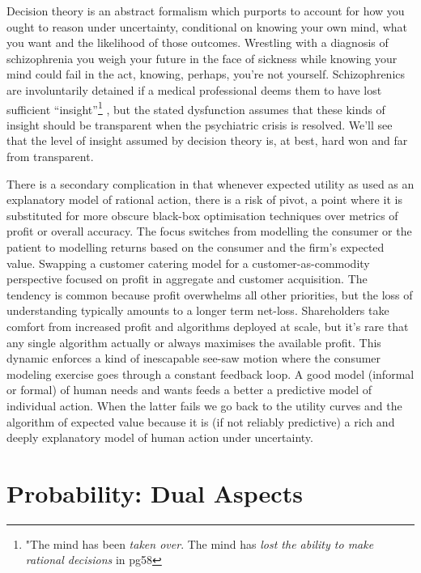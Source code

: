 \documentclass[
]{book}
\theoremstyle{definition}
\theoremstyle{definition}
\theoremstyle{definition}
\theoremstyle{remark}
\begin{document}
Decision theory is an abstract formalism which purports to account for how you ought to reason under uncertainty, conditional on knowing your own mind, what you want and the likelihood of those outcomes. Wrestling with a diagnosis of schizophrenia you weigh your future in the face of sickness while knowing your mind could fail in the act, knowing, perhaps, you're not yourself. Schizophrenics are involuntarily detained if a medical professional deems them to have lost sufficient ``insight''\footnote{"The mind has been \emph{taken over}. The mind has \emph{lost the ability to make rational decisions} in \citep{WangSchizophrenia} pg58} , but the stated dysfunction assumes that these kinds of insight should be transparent when the psychiatric crisis is resolved. We'll see that the level of insight assumed by decision theory is, at best, hard won and far from transparent.

There is a secondary complication in that whenever expected utility as used as an explanatory model of rational action, there is a risk of pivot, a point where it is substituted for more obscure black-box optimisation techniques over metrics of profit or overall accuracy. The focus switches from modelling the consumer or the patient to modelling returns based on the consumer and the firm's expected value. Swapping a customer catering model for a customer-as-commodity perspective focused on profit in aggregate and customer acquisition. The tendency is common because profit overwhelms all other priorities, but the loss of understanding typically amounts to a longer term net-loss. Shareholders take comfort from increased profit and algorithms deployed at scale, but it's rare that any single algorithm actually or always maximises the available profit. This dynamic enforces a kind of inescapable see-saw motion where the consumer modeling exercise goes through a constant feedback loop. A good model (informal or formal) of human needs and wants feeds a better a predictive model of individual action. When the latter fails we go back to the utility curves and the algorithm of expected value because it is (if not reliably predictive) a rich and deeply explanatory model of human action under uncertainty.

\hypertarget{probability-dual-aspects}{%
\section{Probability: Dual Aspects}\label{probability-dual-aspects}}
\end{document}
